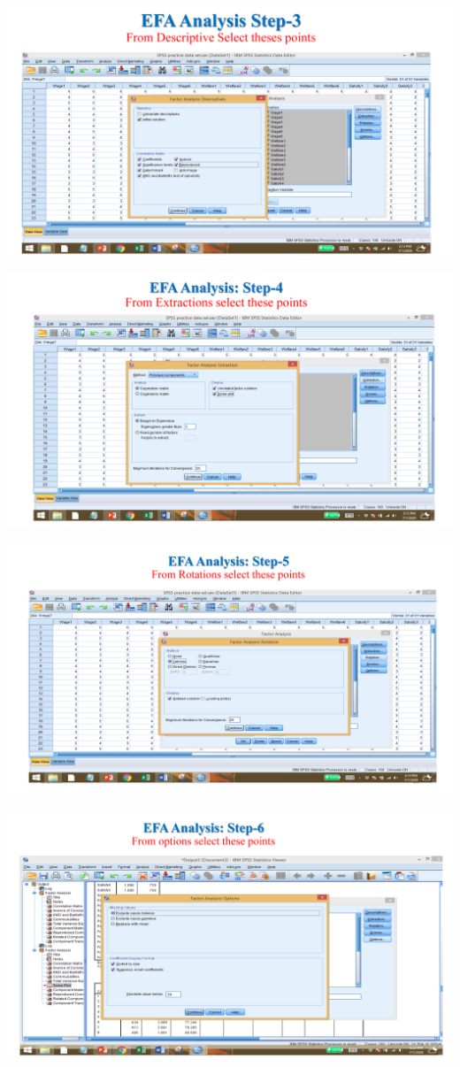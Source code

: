 \documentclass[
  letterpaper,
  DIV=11,
  numbers=noendperiod]{scrreprt}
\begin{document}
\includegraphics{images/slides/img_Page_072.png}

\includegraphics{images/slides/img_Page_073.png}

\includegraphics{images/slides/img_Page_074.png}

\includegraphics{images/slides/img_Page_075.png}
\end{document}

